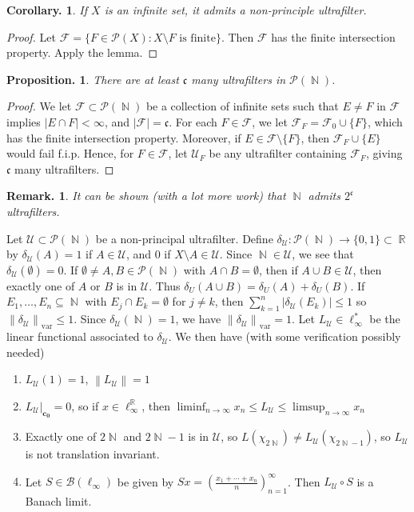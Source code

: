 \documentclass[11pt, a4paper]{memoir}
\DeclareMathOperator{\N}{{\mathbb{N}}}
\DeclareMathOperator{\R}{{\mathbb{R}}}
\newcommand{\norm}[1]{\ensuremath{\left\lVert#1\right\rVert}}
\theoremstyle{change}
\newtheorem{corollary}[theorem]{Corollary.}
\newtheorem{proposition}[theorem]{Proposition.}
\theoremstyle{plain}
\theoremstyle{nonumberplain}
\newtheorem{remark}{Remark.}
\newtheorem{proof}{Proof}
\numberwithin{equation}{section}
\begin{document}
\begin{corollary}
    If $X$ is an infinite set, it admits a non-principle ultrafilter.
\end{corollary}
\begin{proof}
    Let $\mathcal{F}=\{F\in\mathcal{P}(X):X\setminus F\text{ is finite}\}$.
    Then $\mathcal{F}$ has the finite intersection property.
    Apply the lemma.
\end{proof}
\begin{proposition}
    There are at least $\mathfrak{c}$ many ultrafilters in $\mathcal{P}(\N)$.
\end{proposition}
\begin{proof}
    We let $\mathcal{F}\subset\mathcal{P}(\N)$ be a collection of infinite sets such that $E\neq F$ in $\mathcal{F}$ implies $|E\cap F|<\infty$, and $|\mathcal{F}|=\mathfrak{c}$.
    For each $F\in\mathcal{F}$, we let $\mathcal{F}_F=\mathcal{F}_0\cup\{F\}$, which has the finite intersection property.
    Moreover, if $E\in\mathcal{F}\setminus\{F\}$, then $\mathcal{F}_F\cup\{E\}$ would fail f.i.p.
    Hence, for $F\in\mathcal{F}$, let $\mathcal{U}_F$ be any ultrafilter containing $\mathcal{F}_F$, giving $\mathfrak{c}$ many ultrafilters.
\end{proof}
\begin{remark}
    It can be shown (with a lot more work) that $\N$ admits $2^\mathfrak{c}$ ultrafilters.
\end{remark}
Let $\mathcal{U}\subset\mathcal{P}(\N)$ be a non-principal ultrafilter.
Define $\delta_{\mathcal{U}}:\mathcal{P}(\N)\to\{0,1\}\subset\R$ by $\delta_{\mathcal{U}}(A)=1$ if $A\in\mathcal{U}$, and $0$ if $X\setminus A\in\mathcal{U}$.
Since $\N\in\mathcal{U}$, we see that $\delta_{\mathcal{U}}(\emptyset)=0$.
If $\emptyset\neq A,B\in\mathcal{P}(\N)$ with $A\cap B=\emptyset$, then if $A\cup B\in\mathcal{U}$, then exactly one of $A$ or $B$ is in $\mathcal{U}$.
Thus $\delta_U(A\cup B)=\delta_U(A)+\delta_U(B)$.
If $E_1,\ldots,E_n\subseteq\N$ with $E_j\cap E_k=\emptyset$ for $j\neq k$, then $\sum_{k=1}^n|\delta_{\mathcal{U}}(E_k)|\leq 1$ so $\norm{\delta_{\mathcal{U}}}_{\text{var}}\leq 1$.
Since $\delta_{\mathcal{U}}(\N)=1$, we have $\norm{\delta_{\mathcal{U}}}_{\text{var}}=1$.
Let $L_{\mathcal{U}}\in\ell_\infty^*$ be the linear functional associated to $\delta_{\mathcal{U}}$.
We then have (with some verification possibly needed)
\begin{enumerate}[nl,r]
    \item $L_{\mathcal{U}}(1)=1$, $\norm{L_{\mathcal{U}}}=1$
    \item $L_{\mathcal{U}}|_{\mathbf{c_0}}=0$, so if $x\in\ell_\infty^{\R}$, then $\liminf_{n\to\infty}x_n\leq L_{\mathcal{U}}\leq\limsup_{n\to\infty}x_n$
    \item Exactly one of $2\N$ and $2\N-1$ is in $\mathcal{U}$, so $L(\chi_{2\N})\neq L_{\mathcal{U}}(\chi_{2\N-1})$, so $L_{\mathcal{U}}$ is not translation invariant.
    \item Let $S\in\mathcal{B}(\ell_\infty)$ be given by $Sx=\left(\frac{x_1+\cdots+x_n}{n}\right)_{n=1}^\infty$.
        Then $L_{\mathcal{U}}\circ S$ is a Banach limit.
\end{enumerate}
\end{document}
